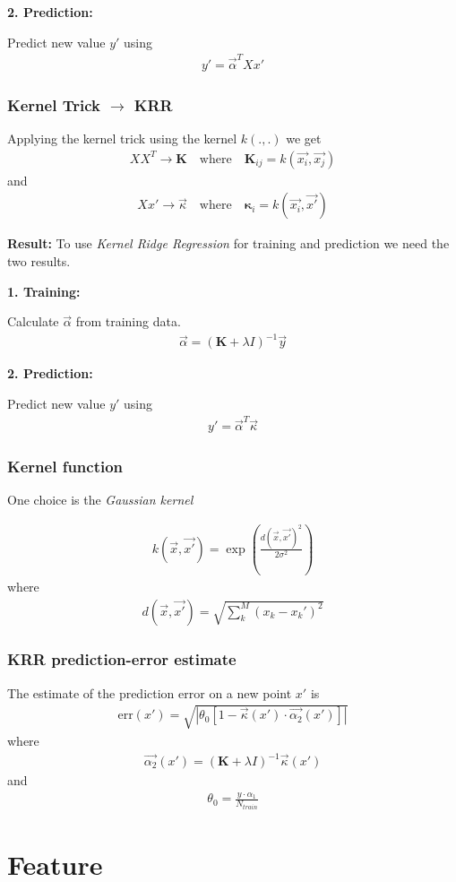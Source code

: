 \documentclass[english,a4paper,oneside, twocolumn,article,9pt]{memoir}
\newcommand{\mb}[1]{\mathbf{#1}}
\begin{document}
\textbf{2. Prediction:}

Predict new value $y'$ using
\begin{align*}
y' = \vec{\alpha}^T Xx'
\end{align*}

\subsection{Kernel Trick $\rightarrow$ KRR}
Applying the kernel trick using the kernel $k(.,.)$ we get
\begin{align*}
XX^T \rightarrow \mb{K} \quad \text{where} \quad \mb{K}_{ij} = k(\vec{x_i},\vec{x_j})
\end{align*}
and
\begin{align*}
Xx' \rightarrow \vec{\kappa} \quad \text{where} \quad \mb{\kappa}_{i} = k(\vec{x_i},\vec{x'})
\end{align*}

\textbf{Result:} To use \textit{Kernel Ridge Regression} for training and prediction we need the two results.

\bigskip

\textbf{1. Training:}

Calculate $\vec{\alpha}$ from training data.
\begin{align}
\vec{\alpha} = (\mb{K} + \lambda I)^{-1}\vec{y}
\end{align} 

\textbf{2. Prediction:}

Predict new value $y'$ using
\begin{align}
y' = \vec{\alpha}^T \vec{\kappa}
\end{align}

\subsection{Kernel function}

One choice is the \textit{Gaussian kernel}

\begin{align}
k(\vec{x}, \vec{x'}) = \exp\left(\frac{d(\vec{x}, \vec{x'})^2}{2\sigma^2}\right)
\end{align}
where
\begin{align}
d(\vec{x}, \vec{x'}) = \sqrt{\sum_{k}^{M}(x_k - x_k')^2}
\end{align}

\subsection{KRR prediction-error estimate}
The estimate of the prediction error on a new point $x'$ is
\begin{align}
\text{err}(x') = \sqrt{\left|\theta_0[1-\vec{\kappa}(x')\cdot\vec{\alpha_2}(x')]\right|}
\end{align}
where
\begin{align*}
\vec{\alpha_2}(x') = (\mb{K} + \lambda I)^{-1}\vec{\kappa}(x')
\end{align*}
and
\begin{align*}
\theta_0 = \frac{y\cdot \alpha_1}{N_{train}}
\end{align*}


\chapter{Feature}
\end{document}
